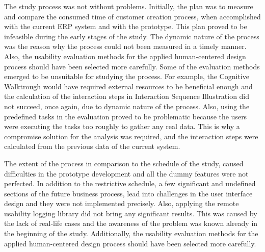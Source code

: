 \documentclass[12pt,a4paper,oneside,pdftex]{report}
\begin{document}
The study process was not without problems. Initially, the plan was to measure and compare the consumed time of customer creation process, when accomplished with the current ERP system and with the prototype. This plan proved to be infeasible during the early stages of the study. The dynamic nature of the process was the reason why the process could not been measured in a timely manner. Also, the usability evaluation methods for the applied human-centered design process should have been selected more carefully. 
Some of the evaluation methods emerged to be unsuitable for studying the process. For example, the Cognitive Walktrough would have required external resources to be beneficial enough and the calculation of the interaction steps in Interaction Sequence Illustration did not succeed, once again, due to dynamic  nature of the process. Also, using the predefined tasks in the evaluation proved to be problematic because the users were executing the tasks too roughly to gather any real data. This is why a compromise solution for the analysis was required, and the interaction steps were calculated from the previous data of the current system. 

The extent of the process in comparison to the schedule of the study, caused difficulties in the prototype development and all the dummy features were not perfected. In addition to the restrictive schedule, a few significant and undefined sections of the future business process, lead into challenges in the user interface design and they were not implemented precisely. Also, applying the remote usability logging library did not bring any significant results. This was caused by the lack of real-life cases and the awareness of the problem was known already in the beginning of the study. Additionally, the usability evaluation methods for the applied human-centered design process should have been selected more carefully. 
\end{document}
